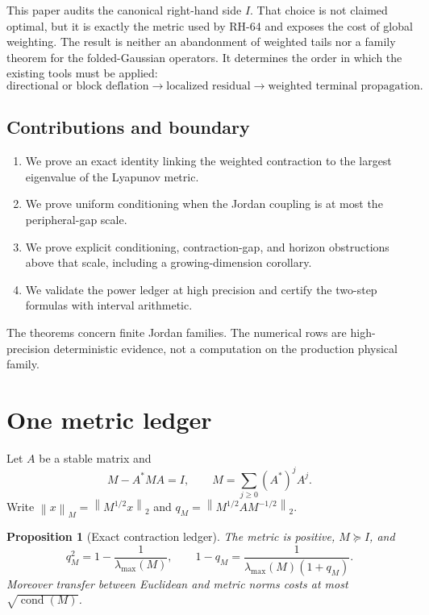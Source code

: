 \documentclass[11pt]{article}
\newtheorem{proposition}[theorem]{Proposition}
\newcommand{\norm}[1]{\left\lVert#1\right\rVert}
\newcommand{\cond}{\operatorname{cond}}
\begin{document}
This paper audits the canonical right-hand side $I$.  That choice is not
claimed optimal, but it is exactly the metric used by RH-64 and exposes the
cost of global weighting.  The result is neither an abandonment of weighted
tails nor a family theorem for the folded-Gaussian operators.  It determines
the order in which the existing tools must be applied:
\begin{equation}
 \text{directional or block deflation}
 \longrightarrow \text{localized residual}
 \longrightarrow \text{weighted terminal propagation}.
 \label{eq:route-order}
\end{equation}

\subsection*{Contributions and boundary}

\begin{enumerate}[leftmargin=2.2em]
 \item We prove an exact identity linking the weighted contraction to the
       largest eigenvalue of the Lyapunov metric.
 \item We prove uniform conditioning when the Jordan coupling is at most the
       peripheral-gap scale.
 \item We prove explicit conditioning, contraction-gap, and horizon
       obstructions above that scale, including a growing-dimension
       corollary.
 \item We validate the power ledger at high precision and certify the
       two-step formulas with interval arithmetic.
\end{enumerate}

The theorems concern finite Jordan families.  The numerical rows are
high-precision deterministic evidence, not a computation on the production
physical family.

\section{One metric ledger}
\label{sec:ledger}

Let $A$ be a stable matrix and
\begin{equation}
 M-A^*MA=I,
 \qquad
 M=\sum_{j\ge0}(A^*)^jA^j.
 \label{eq:lyapunov}
\end{equation}
Write $\norm{x}_M=\norm{M^{1/2}x}_2$ and
$q_M=\norm{M^{1/2}AM^{-1/2}}_2$.

\begin{proposition}[Exact contraction ledger]
\label{prop:ledger}
The metric is positive, $M\succeq I$, and
\begin{equation}
 q_M^2=1-\frac1{\lambda_{\max}(M)},
 \qquad
 1-q_M=\frac{1}{\lambda_{\max}(M)(1+q_M)}.
 \label{eq:exact-gap}
\end{equation}
Moreover transfer between Euclidean and metric norms costs at most
$\sqrt{\cond(M)}$.
\end{proposition}
\end{document}
